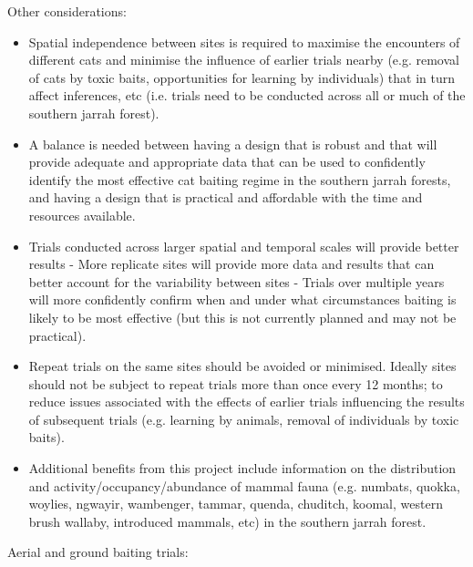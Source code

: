 \documentclass[version=last,
    paper=a4,                               %
    10pt,                                   %
    dvipsnames,
    oneside,                              %
    headings=openany,                       %
    open=any,
    BCOR=7mm,                               %
    DIV=15,     %
]{scrbook}
\begin{document}
Other considerations:

\begin{itemize}
\itemsep1pt\parskip0pt
\item
  Spatial independence between sites is required to maximise the
  encounters of different cats and minimise the influence of earlier
  trials nearby (e.g. removal of cats by toxic baits, opportunities for
  learning by individuals) that in turn affect inferences, etc (i.e.
  trials need to be conducted across all or much of the southern jarrah
  forest).
\item
  A balance is needed between having a design that is robust and that
  will provide adequate and appropriate data that can be used to
  confidently identify the most effective cat baiting regime in the
  southern jarrah forests, and having a design that is practical and
  affordable with the time and resources available.
\item
  Trials conducted across larger spatial and temporal scales will
  provide better results - More replicate sites will provide more data
  and results that can better account for the variability between sites
  - Trials over multiple years will more confidently confirm when and
  under what circumstances baiting is likely to be most effective (but
  this is not currently planned and may not be practical).
\item
  Repeat trials on the same sites should be avoided or minimised.
  Ideally sites should not be subject to repeat trials more than once
  every 12 months; to reduce issues associated with the effects of
  earlier trials influencing the results of subsequent trials (e.g.
  learning by animals, removal of individuals by toxic baits).
\item
  Additional benefits from this project include information on the
  distribution and activity/occupancy/abundance of mammal fauna (e.g.
  numbats, quokka, woylies, ngwayir, wambenger, tammar, quenda,
  chuditch, koomal, western brush wallaby, introduced mammals, etc) in
  the southern jarrah forest.
\end{itemize}

Aerial and ground baiting trials:
\end{document}

